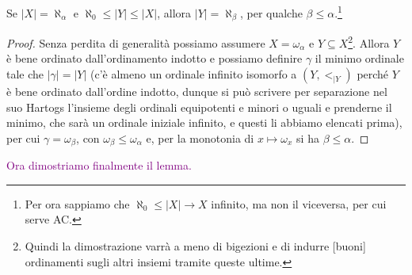 \begin{remark}
	Se $|X| = \aleph_\alpha$ e $\aleph_0 \leq |Y| \leq |X|$, allora $|Y| = \aleph_\beta$, per qualche $\beta \leq \alpha$.\footnote{Per ora sappiamo che $\aleph_0 \leq |X| \to X$ infinito, ma non il viceversa, per cui serve AC.}
\end{remark}

\begin{proof}
	Senza perdita di generalit\`a possiamo assumere $X = \omega_\alpha$ e $Y \subseteq X$\footnote{Quindi la dimostrazione varr\`a a meno di bigezioni e di indurre [buoni] ordinamenti sugli altri insiemi tramite queste ultime.}. Allora $Y$ \`e bene ordinato dall'ordinamento indotto e possiamo definire $\gamma$ il minimo ordinale 
	tale che $|\gamma| = |Y|$ (c'\`e almeno un ordinale infinito isomorfo a $(Y,<_{|Y})$ perch\'e $Y$ \`e bene ordinato dall'ordine indotto, dunque si pu\`o scrivere per separazione nel suo Hartogs l'insieme degli ordinali equipotenti e minori o uguali e prenderne il minimo, che sar\`a un ordinale iniziale infinito, e questi li abbiamo
	elencati prima), per cui $\gamma = \omega_\beta$, con $\omega_\beta \leq \omega_\alpha$ e, per la monotonia di $x \mapsto \omega_x$ si ha $\beta \leq \alpha$. 
\end{proof}

\textcolor{purple}{Ora dimostriamo finalmente il lemma.}

